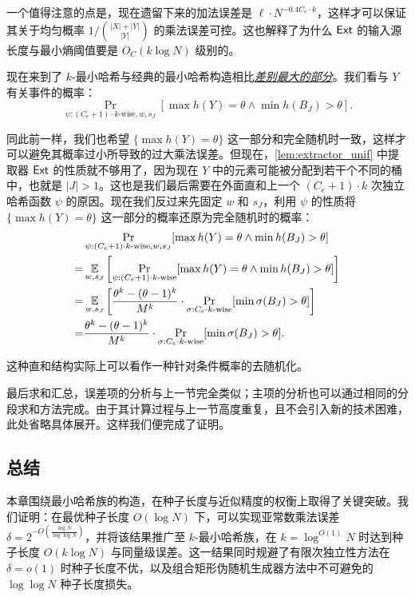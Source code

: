 一个值得注意的点是，现在遗留下来的加法误差是 $\ell \cdot N^{-0.4 C_e \cdot k}$，这样才可以保证其关于均匀概率 $1 / \binom{|X| + |Y|}{|Y|}$ 的乘法误差可控。这也解释了为什么 $\mathsf{Ext}$ 的输入源长度与最小熵阈值要是 $O_C(k \log N)$ 级别的。

现在来到了 $k$-最小哈希与经典的最小哈希构造相比\underline{\emph{差别最大的部分}}。我们看与 $Y$ 有关事件的概率：
$$
\Pr_{\psi : (C_e + 1) \cdot k\text{-wise}, w, s_J}[ \max h(Y) = \theta \wedge \min h(B_J) > \theta ].
$$

同此前一样，我们也希望 $\{\max h(Y) = \theta\}$ 这一部分和完全随机时一致，这样才可以避免其概率过小所导致的过大乘法误差。但现在，\cref{lem:extractor_unif} 中提取器 $\mathsf{Ext}$ 的性质就不够用了，因为现在 $Y$ 中的元素可能被分配到若干个不同的桶中，也就是 $|J| > 1$。这也是我们最后需要在外面直和上一个 $(C_e + 1) \cdot k$ 次独立哈希函数 $\psi$ 的原因。现在我们反过来先固定 $w$ 和 $s_J$，利用 $\psi$ 的性质将 $\{\max h(Y) = \theta\}$ 这一部分的概率还原为完全随机时的概率：
\begin{align*}
      & \Pr_{\psi : (C_e + 1) \cdot k\text{-wise}, w, s_J}[ \max h(Y) = \theta \wedge \min h(B_J) > \theta ] \\
    = & \operatorname*{\mathbb{E}}_{w, s_J}\left[ \Pr_{\psi : (C_e + 1) \cdot k\text{-wise}}[ \max h(Y) = \theta \wedge \min h(B_J) > \theta ] \right] \\
    = & \operatorname*{\mathbb{E}}_{w, s_J}\left[ \frac{\theta^k - (\theta - 1)^k}{M^k} \cdot \Pr_{\sigma : C_e \cdot k\text{-wise}}[ \min \sigma(B_J) > \theta ] \right] \\
    = & \frac{\theta^k - (\theta - 1)^k}{M^k} \cdot \Pr_{\sigma : C_e \cdot k\text{-wise}}[ \min \sigma(B_J) > \theta ].
\end{align*}

这种直和结构实际上可以看作一种针对条件概率的去随机化。

最后求和汇总，误差项的分析与上一节完全类似；主项的分析也可以通过相同的分段求和方法完成。由于其计算过程与上一节高度重复，且不会引入新的技术困难，此处省略具体展开。这样我们便完成了证明。

\subsection{总结}

本章围绕最小哈希族的构造，在种子长度与近似精度的权衡上取得了关键突破。我们证明：在最优种子长度 $O(\log N)$ 下，可以实现亚常数乘法误差 $\delta = 2^{-O\left(\frac{\log N}{\log \log N}\right)}$，并将该结果推广至 $k$-最小哈希族，在 $k = \log^{O(1)}N$ 时达到种子长度 $O(k \log N)$ 与同量级误差。这一结果同时规避了有限次独立性方法在 $\delta = o(1)$ 时种子长度不优，以及组合矩形伪随机生成器方法中不可避免的 $\log \log N$ 种子长度损失。

